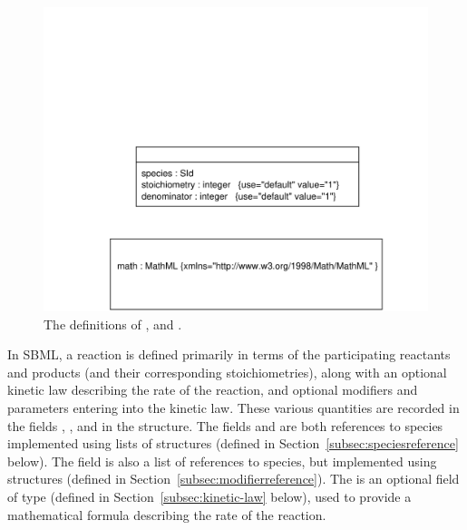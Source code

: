 \documentclass[10pt,twocolumntoc]{cekarticle}
\begin{document}
\begin{figure}[htb]
  \centering
  \includegraphics[scale = 0.68]{reaction}
  \caption{The definitions of ,  and
    .}
  \label{fig:reaction}
\end{figure}

In SBML, a reaction is defined primarily in terms of the participating
reactants and products (and their corresponding stoichiometries), along
with an optional kinetic law describing the rate of the reaction, and
optional modifiers and parameters entering into the kinetic law.  These
various quantities are recorded in the fields ,
,  and  in the
 structure.  The fields  and
 are both references to species implemented using lists of
 structures (defined in
Section~\ref{subsec:speciesreference} below).  The  field
is also a list of references to species, but implemented using
 structures (defined in
Section~\ref{subsec:modifierreference}).  The  is an
optional field of type  (defined in
Section~\ref{subsec:kinetic-law} below), used to provide a mathematical
formula describing the rate of the reaction.
\end{document}
